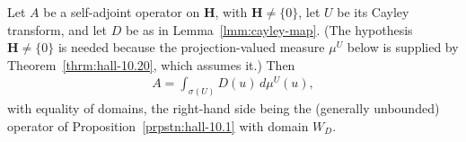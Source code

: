\begin{proposition}
    \label{prpstn:hall-10.29}
    \leanok
    Let $A$ be a self-adjoint operator on $\mathbf{H}$, with $\mathbf{H} \ne \{0\}$, let $U$ be its Cayley transform, and let $D$ be as in Lemma~\ref{lmm:cayley-map}. (The hypothesis $\mathbf{H} \ne \{0\}$ is needed because the projection-valued measure $\mu^U$ below is supplied by Theorem~\ref{thrm:hall-10.20}, which assumes it.) Then
    \begin{align}
        A = \int_{\sigma(U)} D(u) \, d\mu^U(u),
    \end{align}
    with equality of domains, the right-hand side being the (generally unbounded) operator of Proposition~\ref{prpstn:hall-10.1} with domain $W_D$.
\end{proposition}
